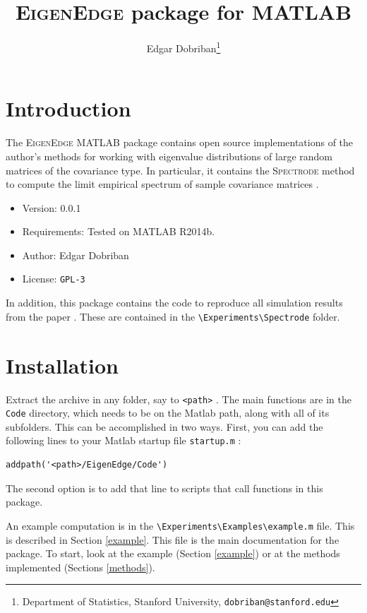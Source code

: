 \documentclass[english,11pt]{article} %
\title{\textsc{EigenEdge} package for MATLAB}
\author{Edgar Dobriban\thanks{Department of Statistics, Stanford University, \texttt{dobriban@stanford.edu}} }
\begin{document}
\maketitle
\tableofcontents
\section{Introduction}

The \textsc{EigenEdge} MATLAB package contains open source implementations of the author's methods for working with eigenvalue distributions of large random matrices of the covariance type. In particular, it contains the \textsc{Spectrode} method to compute the limit empirical spectrum of sample covariance matrices \citep[proposed in][]{dobriban2015precise}. 

\begin{itemize}
\item{Version: } 0.0.1
\item{Requirements: } Tested on MATLAB R2014b. 
\item{Author: } Edgar Dobriban
\item{License: } \verb+GPL-3+
\end{itemize}

In addition, this package contains the code to reproduce all simulation results from the paper \cite{dobriban2015precise}. These are contained in the \verb+\Experiments\Spectrode+ folder.

\section{Installation}

Extract the archive in any folder, say to \verb+<path>+ . The main functions are in the \verb+Code+ directory, which needs to be on the Matlab path, along with all of its subfolders. This can be accomplished in two ways. First, you can add the following lines to your Matlab startup file \verb+startup.m+ :

\begin{verbatim}
addpath('<path>/EigenEdge/Code')
\end{verbatim}

The second option is to add that line to scripts that call functions in this package. 

An example computation is in the \verb+\Experiments\Examples\example.m+ file. This is described in Section \ref{example}. This file is the main documentation for the package. To start, look at the example (Section \ref{example}) or at the methods implemented (Sections \ref{methods}).
\end{document}
